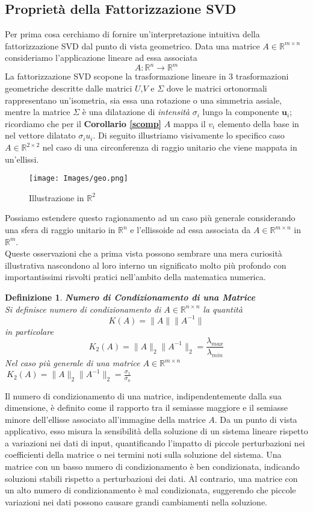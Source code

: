 \documentclass[11pt]{article}
\newtheorem{definition}{Definizione}
\newcommand{\R}{\mathbb{R}}
\begin{document}
\subsection{Proprietà della Fattorizzazione SVD}
Per prima cosa cerchiamo di fornire un'interpretazione intuitiva della fattorizzazione SVD dal punto di vista geometrico. 
Data una matrice $A \in \R^{m \times n}$ consideriamo l'applicazione lineare ad essa associata $$A: \R^n \rightarrow \R^m$$
La fattorizzazione SVD scopone la trasformazione lineare in 3 trasformazioni geometriche descritte dalle matrici $U$,$V$ e $\Sigma$ dove le matrici ortonormali rappresentano un'isometria, sia essa una rotazione o una simmetria assiale, mentre la matrice $\Sigma$ è una dilatazione di \textit{intensità} $\sigma_i$ lungo la componente $\mathbf{u}_i$; ricordiamo che per il \textbf{Corollario \ref{scomp}} $A$ mappa il $v_i$ elemento della base in nel vettore dilatato $\sigma_iu_i$. Di seguito illustriamo visivamente lo specifico caso $A \in \R^{2 \times 2}$ nel caso di una circonferenza di raggio unitario che viene mappata in un'ellissi.
\begin{figure}[H]
    \centering
    \texttt{[image: Images/geo.png]}
    \caption{Illustrazione in $\R^2$}
    \label{fig:geo}
\end{figure} 
\noindent
Possiamo estendere questo ragionamento ad un caso più generale considerando una sfera di raggio unitario in $\R^n$ e l'ellissoide ad essa associata da $A \in \R^{m \times n}$ in $\R^m$.\\
Queste osservazioni che a prima vista possono sembrare una mera curiosità illustrativa nascondono al loro interno un significato molto più profondo con importantissimi risvolti pratici nell'ambito della matematica numerica. 
\begin{definition}\textbf{Numero di Condizionamento di una Matrice}\\
Si definisce numero di condizionamento di \( A \in \R^{ n \times n } \) la quantità 
\[ K(A) = \|A\| \|A^{-1} \| \]
in particolare \[ K_2(A) = \|A\|_2 \|A^{-1} \|_2 = \frac{\lambda_{max}}{\lambda_{min}}\]
Nel caso più generale di una matrice \(A \in \R^{m \times n} \) \(\ K_2(A) = \|A\|_2 \|A^{-1} \|_2 = \frac{\sigma_{1}}{\sigma_{n}}\)
\end{definition}
Il numero di condizionamento di una matrice, indipendentemente dalla sua dimensione, è definito come il rapporto tra il semiasse maggiore e il semiasse minore dell'ellisse associato all'immagine della matrice \(A\). Da un punto di vista applicativo, esso misura la sensibilità della soluzione di un sistema lineare rispetto a variazioni nei dati di input, quantificando l'impatto di piccole perturbazioni nei coefficienti della matrice o nei termini noti sulla soluzione del sistema. Una matrice con un basso numero di condizionamento è ben condizionata, indicando soluzioni stabili rispetto a perturbazioni dei dati. Al contrario, una matrice con un alto numero di condizionamento è mal condizionata, suggerendo che piccole variazioni nei dati possono causare grandi cambiamenti nella soluzione.
\end{document}
